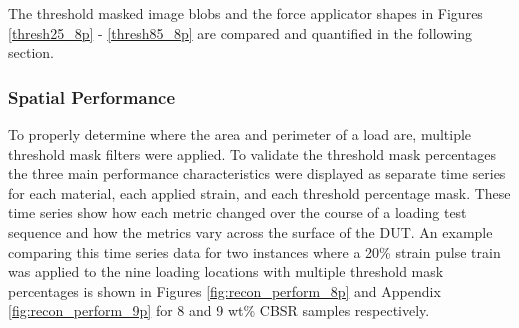The threshold masked image blobs and the force applicator shapes in Figures \ref{thresh25_8p} - \ref{thresh85_8p} are compared and quantified in the following section.

\subsubsection{Spatial Performance}\label{sec:Spatial Performance2}
To properly determine where the area and perimeter of a load are, multiple threshold mask filters were applied. To validate the threshold mask percentages
 the three main performance characteristics were displayed as separate time series for each material, each applied strain, and each threshold percentage mask. These time series show how each metric changed over the course of a loading test sequence and how the metrics vary across the surface of the DUT. An example comparing this time series data for two instances where a 20\% strain pulse train was applied to the nine loading locations with multiple threshold mask percentages is shown in Figures \ref{fig:recon_perform_8p} and Appendix \ref{fig:recon_perform_9p} for 8 and 9 wt\% CBSR samples respectively.
    
